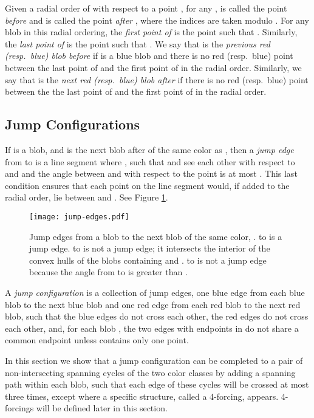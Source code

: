 \documentclass[12pt]{article}
\theoremstyle{definition}
\begin{document}
Given a radial order  of  with respect to a point , for any ,  is called the point \emph{before}  and  is called the point \emph{after} , where the indices are taken modulo .
For any blob  in this radial ordering, the \emph{first point of } is the point  such that .
Similarly, the \emph{last point of } is the point  such that .
We say that  is the \emph{previous red (resp.\ blue) blob before}  if  is a blue blob and there is no red (resp.\ blue) point between the last point of  and the first point of  in the radial order.
Similarly, we say that  is the \emph{next red (resp.\ blue) blob after}  if there is no red (resp.\ blue) point between the the last point of  and the first point of  in the radial order.

\subsection{Jump Configurations}
If  is a blob, and  is the next blob after  of the same color as , then a \emph{jump edge} from  to  is a line segment  where ,  such that  and  see each other with respect to  and  and the angle between  and  with respect to the point  is at most .
This last condition ensures that each point  on the line segment  would, if added to the radial order, lie between  and . See Figure \ref{fig:jump-edges}.



\begin{figure}[h]
\centering
\texttt{[image: jump-edges.pdf]}
\caption{Jump edges from a blob  to the next blob of the same color, .  to  is a jump edge.  to  is not a
jump edge; it intersects the interior of the convex hulls of the blobs
containing  and .
 to  is not a jump edge because the angle from  to  is
greater than .}
\label{fig:jump-edges}
\end{figure}

A \emph{jump configuration}  is a collection of jump edges, one blue edge from each blue blob to the next  blue blob and one red edge from each red blob to the next red blob, such that the blue edges do not cross each other, the red edges do not cross each other, and, for each blob , the two edges with endpoints in  do not share a common endpoint unless  contains only one point.

In this section we show that a jump configuration can be completed to a pair of non-intersecting spanning cycles of the two color classes by adding a spanning path within each blob, such that each edge of these cycles will be crossed at most three times, except where a specific structure, called a 4-forcing, appears.
4-forcings will be defined later in this section.
\end{document}
